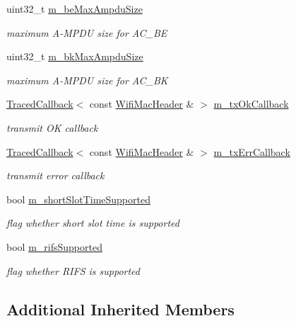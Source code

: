 \begin{DoxyCompactItemize}
uint32\+\_\+t \hyperlink{classns3_1_1RegularWifiMac_a139ebfbbc6ace4132a56b3b437626720}{m\+\_\+be\+Max\+Ampdu\+Size}
\begin{DoxyCompactList}\small\item\em maximum A-\/\+M\+P\+DU size for A\+C\+\_\+\+BE \end{DoxyCompactList}\item 
uint32\+\_\+t \hyperlink{classns3_1_1RegularWifiMac_a17b41d833234be31d9671b34ed9ce959}{m\+\_\+bk\+Max\+Ampdu\+Size}
\begin{DoxyCompactList}\small\item\em maximum A-\/\+M\+P\+DU size for A\+C\+\_\+\+BK \end{DoxyCompactList}\item 
\hyperlink{classns3_1_1TracedCallback}{Traced\+Callback}$<$ const \hyperlink{classns3_1_1WifiMacHeader}{Wifi\+Mac\+Header} \& $>$ \hyperlink{classns3_1_1RegularWifiMac_aa6135b5824d4ee16632c1f4783d49c28}{m\+\_\+tx\+Ok\+Callback}
\begin{DoxyCompactList}\small\item\em transmit OK callback \end{DoxyCompactList}\item 
\hyperlink{classns3_1_1TracedCallback}{Traced\+Callback}$<$ const \hyperlink{classns3_1_1WifiMacHeader}{Wifi\+Mac\+Header} \& $>$ \hyperlink{classns3_1_1RegularWifiMac_ab206880e22c96a9e63e71d79957f75d0}{m\+\_\+tx\+Err\+Callback}
\begin{DoxyCompactList}\small\item\em transmit error callback \end{DoxyCompactList}\item 
bool \hyperlink{classns3_1_1RegularWifiMac_ace05e98c5a79252c9be5fe676dd8b9a2}{m\+\_\+short\+Slot\+Time\+Supported}
\begin{DoxyCompactList}\small\item\em flag whether short slot time is supported \end{DoxyCompactList}\item 
bool \hyperlink{classns3_1_1RegularWifiMac_a7fd4928adf45086e8c122afd2382e91b}{m\+\_\+rifs\+Supported}
\begin{DoxyCompactList}\small\item\em flag whether R\+I\+FS is supported \end{DoxyCompactList}\end{DoxyCompactItemize}
\subsection*{Additional Inherited Members}


